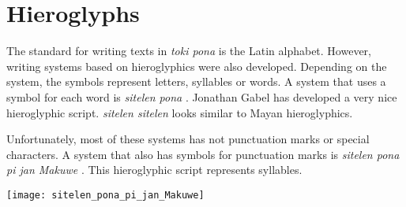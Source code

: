 
\section{Hieroglyphs}
The standard for writing texts in \textit{toki pona} is the Latin alphabet.
However, writing systems based on hieroglyphics were also developed.
Depending on the system, the symbols represent letters, syllables or words.
A system that uses a symbol for each word is \textit{sitelen pona} \cite{www:tokipona.org:02}.
Jonathan Gabel has developed a very nice hieroglyphic script.
\textit{sitelen sitelen} \cite{www:jonathangabel.com:01} looks similar to Mayan hieroglyphics.

Unfortunately, most of these systems has not punctuation marks or special characters.
A system that also has symbols for punctuation marks is \textit{sitelen pona pi jan Makuwe} \cite{www:janMakuwe:01}.
This hieroglyphic script represents syllables.

\texttt{[image: sitelen\_pona\_pi\_jan\_Makuwe]}
